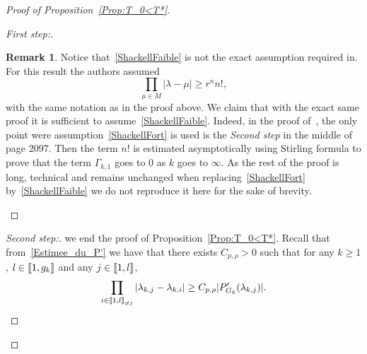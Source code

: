 \documentclass[10pt]{amsart}
\theoremstyle{definition}\newtheorem{defi}[theo]{Definition}\newtheorem{rema}[theo]{Remark}\newtheorem{exam}[theo]{Example}\newtheorem{exem}[theo]{Example}\newtheorem{nota}[theo]{Notation}
\newenvironment{step}[1]{\begin{proof}[#1]}{\let\qed\relax\end{proof}}
\newcommand{\llbracket}{\mathopen{[\mkern -2.7mu[}}
\newcommand{\rrbracket}{\mathclose{]\mkern -2.7mu]}}
\newcommand{\inter}[2]{\llbracket #1,#2 \rrbracket}
\newcommand{\interexclu}[3]{\llbracket #1,#2\rrbracket_{\neq #3}}
\newcommand{\n}{g}
\newenvironment{proofc}[1][\proofname]{\begin{proof}[{#1}]}{\end{proof}}
\begin{document}
\begin{proofc}[{Proof of Proposition~\ref{Prop:T_0<T*}}]
\begin{step}{First step:}
\begin{rema}
Notice that~\eqref{ShackellFaible} is not the exact assumption required in\linebreak\cite[Theorem~3.8]{AmmarKhodjaBenabdallahGonzalez-BurgosdeTeresa:2014}. For this result the authors assumed
\begin{equation}\label{ShackellFort}
\prod_{\mu\in M} |\lambda- \mu| \geq r^n n!,
\end{equation}
with the same notation as in the proof above. We claim that with the exact same proof it is sufficient to assume~\eqref{ShackellFaible}. Indeed, in the proof of~\cite[Theorem~3.8]{AmmarKhodjaBenabdallahGonzalez-BurgosdeTeresa:2014}, the only point were assumption~\eqref{ShackellFort} is used is the \emph{Second step} in the middle of page 2097. Then the term $n!$ is estimated asymptotically using Stirling formula to prove that the term $\Gamma_{k,1}$ goes to $0$ as $k$ goes to $\infty$. As the rest of the proof is long, technical and remains unchanged when replacing~\eqref{ShackellFort} by~\eqref{ShackellFaible} we do not reproduce it here for the sake of brevity.
\end{rema}
\end{step}

\begin{step}{Second step:}
we end the proof of Proposition~\ref{Prop:T_0<T*}. Recall that from~\eqref{Estimee_du_P'} we have that there exists $C_{p, \rho}>0$ such that for any $k\geq 1$, $l \in \inter{1}{\n_k}$ and any $j \in \inter{1}{l}$,
\begin{equation*}
\prod_{i\in \interexclu{1}{l}{j}} | \lambda_{k,j} - \lambda_{k,i}| \geq C_{p,\rho} |P_{G_k}' (\lambda_{k,j}) |.
\end{equation*}



\end{step}
\end{proofc}
\end{document}
